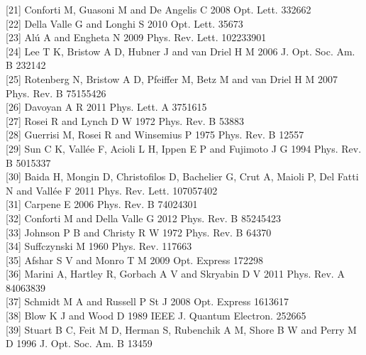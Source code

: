 \documentclass[10pt]{article}
\begin{document}
[21] Conforti M, Guasoni M and De Angelis C 2008 Opt. Lett. 332662\\[0pt]
[22] Della Valle G and Longhi S 2010 Opt. Lett. 35673\\[0pt]
[23] Alú A and Engheta N 2009 Phys. Rev. Lett. 102233901\\[0pt]
[24] Lee T K, Bristow A D, Hubner J and van Driel H M 2006 J. Opt. Soc. Am. B 232142\\[0pt]
[25] Rotenberg N, Bristow A D, Pfeiffer M, Betz M and van Driel H M 2007 Phys. Rev. B 75155426\\[0pt]
[26] Davoyan A R 2011 Phys. Lett. A 3751615\\[0pt]
[27] Rosei R and Lynch D W 1972 Phys. Rev. B 53883\\[0pt]
[28] Guerrisi M, Rosei R and Winsemius P 1975 Phys. Rev. B 12557\\[0pt]
[29] Sun C K, Vallée F, Acioli L H, Ippen E P and Fujimoto J G 1994 Phys. Rev. B 5015337\\[0pt]
[30] Baida H, Mongin D, Christofilos D, Bachelier G, Crut A, Maioli P, Del Fatti N and Vallée F 2011 Phys. Rev. Lett. 107057402\\[0pt]
[31] Carpene E 2006 Phys. Rev. B 74024301\\[0pt]
[32] Conforti M and Della Valle G 2012 Phys. Rev. B 85245423\\[0pt]
[33] Johnson P B and Christy R W 1972 Phys. Rev. B 64370\\[0pt]
[34] Suffczynski M 1960 Phys. Rev. 117663\\[0pt]
[35] Afshar S V and Monro T M 2009 Opt. Express 172298\\[0pt]
[36] Marini A, Hartley R, Gorbach A V and Skryabin D V 2011 Phys. Rev. A 84063839\\[0pt]
[37] Schmidt M A and Russell P St J 2008 Opt. Express 1613617\\[0pt]
[38] Blow K J and Wood D 1989 IEEE J. Quantum Electron. 252665\\[0pt]
[39] Stuart B C, Feit M D, Herman S, Rubenchik A M, Shore B W and Perry M D 1996 J. Opt. Soc. Am. B 13459
\end{document}
